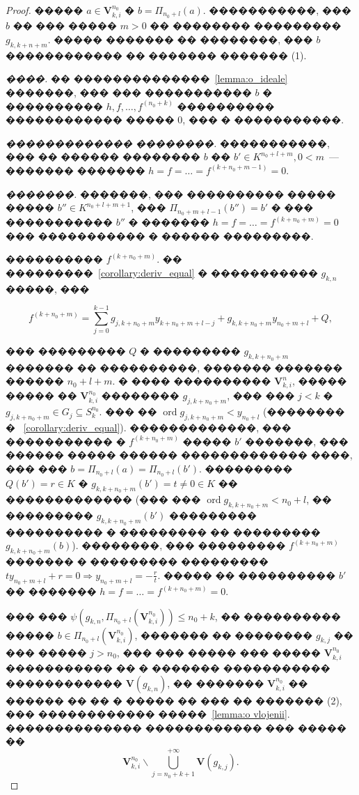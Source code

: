 \documentclass[16pt]{article}
\DeclareMathOperator{\ord}{ord}
\theoremstyle{plain}
\theoremstyle{definition}
\theoremstyle{remark}
\begin{document}
\begin{proof}
����� $a\in \mathbf{V}_{k,i}^{n_0}$ � $b=\Pi_{n_0+l}(a)$. �����������, ��� $b$ �� ��� ����� $m>0$ �� �������� ��������� $g_{k,k+n+m}$. ����� ������� �� ��������, ��� $b$ ������������ �� ������� ������� (1).

{\it ����.} �� ��������������~\ref{lemma:o_ideale} �������, ��� ��� ����������� $b$ � ���������� $h,f,\ldots,f^{(n_0+k)}$ ���������� ������������ ����� 0, ��� � �����������.

{\it ������������� ��������.} �����������, ��� �� ������ �������� $b$ �� $b'\in K^{n_0+l+m}, 0< m$~--- ������� ������� $h=f=\ldots=f^{(k+n_0+m-1)}=0$.

{\it �������.} �������, ��� ���������� ����� ����� $b''\in K^{n_0+l+m+1}$, ��� $\Pi_{n_0+m+l-1}(b'')=b'$ � ��� ����������� $b''$ � ������� $h=f=\ldots=f^{(k+n_0+m)}=0$ ��� ����������� � ������ ���������.

���������� $f^{(k+n_0+m)}$. �� ���������~\ref{corollary:deriv_equal} � ����������� $g_{k,n}$ �����, ���

$$
f^{(k+n_0+m)}=\sum\limits_{j=0}^{k-1} g_{j,k+n_0+m}y_{k+n_0+m+l -j}+g_{k,k+n_0+m}y_{n_0+m+l}  + Q,
$$

��� ��������� $Q$ � ��������� $g_{k,k+n_0+m}$ ������� �� ����������, ������� ������� ������ $n_0+l+m$. � ���� ���������� $\mathbf{V}_{k,i}^n$, ����� ����� �� $\mathbf{V}_{k,i}^{n_0}$ �������� $g_{j,k+n_0+m}$, ��� ��� $j < k$ � $g_{j,k+n_0+m}\in G_j\subseteq S_k^{n_0}$. ��� �� $\ord g_{j,k+n_0+m}<y_{n_0+l}$ (�������� � ~\ref{corollary:deriv_equal}). �������������, ��� ����������� � $f^{(k+n_0+m)}$ ����� $b'$ �������, ��� ������ ����� ������ ������������� ����, ��� ��� $b=\Pi_{n_0+l}(a)=\Pi_{n_0+l}(b')$. ��������� $Q(b')=r\in K$ � $g_{k,k+n_0+m}(b')=t\neq 0\in K$ �� ������������� (��� ��� $\ord g_{k,k+n_0+m}< n_0+l$, �� ��������� $g_{k,k+n_0+m}(b')$ ��������� ���������� � ��������� �� ��������� $g_{k,k+n_0+m}(b)$). ��������, ��� ��������� $f^{(k+n_0+m)}$ ������� � ��������� ��������� $t y_{n_0+m+l}+r=0\Rightarrow y_{n_0+m+l}=-\frac{r}{t}$. ����� �� ���������� $b'$ �� ������� $h=f=\ldots=f^{(k+n_0+m)}=0$.

 ��� ��� $\psi(g_{k,n},\Pi_{n_0+l}(\mathbf{V}_{k,i}^{n_0}))\leqslant n_0+k$, �� ���������� ����� $b\in \Pi_{n_0+l}(\mathbf{V}_{k,i}^{n_0})$,  ������� �� �������� $g_{k,j}$ �� ��� ����� $j>n_0$, ��� ��� ����� ��� ����� $\mathbf{V}_{k,i}^{n_0}$ ����������� �� � ������� ����������� ������������ $\mathbf{V}(g_{k,n})$, �� ������� $\mathbf{V}_{k,i}^{n_0}$ �� ������ �� �� � ����� �� ��� �� ������� (2), ��� ������������ �����~\ref{lemma:o vlojenii}. �������������� ������������ ��� ����� �� $$\mathbf{V}_{k,i}^{n_0}\backslash \bigcup\limits_{j=n_0+k+1}^{+\infty}\mathbf{V}(g_{k,j}).$$
 \end{proof}
\end{document}
